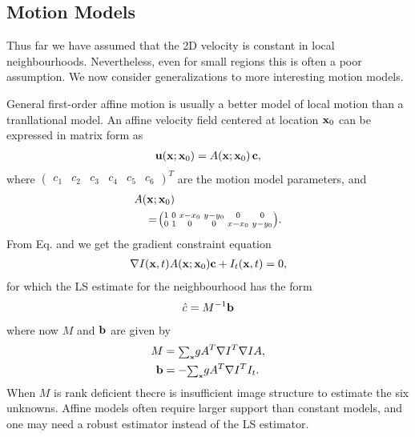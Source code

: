 \begin{compactdesc}
\section{Motion Models}
Thus far we have assumed that the 2D velocity is constant in local neighbourhoods. Nevertheless, even for small regions this is often a poor assumption. We now consider generalizations to more interesting motion models.
\item[\lp{Affine Model}]
	General first-order affine motion is usually a better model of local motion than a tranllational model. An affine velocity field centered at location $\bm{\mathrm{x}}_0$ can be expressed in matrix form as
	\begin{gather}
		\bm{\mathrm{u}}(\bm{\mathrm{x}};\bm{\mathrm{x}}_0)=A\!\left( \bm{\mathrm{x}};\bm{\mathrm{x}}_0 \right)\bm{\mathrm{c}},
		\label{eq:affinevelfield}
	\end{gather}
	where ${\!\left(\!\begin{smallmatrix}
		c_1&c_2&c_3&c_4&c_5&c_6
	\end{smallmatrix}\!\right)\!}^T$ are the motion model parameters, and
	\begin{align*}
		&A(\bm{\mathrm{x}};\bm{\mathrm{x}}_0)\\
		&\quad=
		\!\left(\!\begin{smallmatrix}
			1&0&x-x_0&y-y_0&0&0\\
			0&1&0&0&x-x_0&y-y_0
		\end{smallmatrix}\!\right)\!.
	\end{align*}
	From Eq. \label{eq:brightnessconst3} and \label{eq:affinevelfield} we get the gradient constraint equation
	\begin{gather*}
		\nabla I(\bm{\mathrm{x}},t)A(\bm{\mathrm{x}};\bm{\mathrm{x}}_0)\bm{\mathrm{c}}+I_t(\bm{\mathrm{x}},t)=0,
	\end{gather*}
	for which the LS estimate for the neighbourhood has the form
	\begin{gather}
		\hat{c}=M^{-1}\bm{\mathrm{b}}
		\label{eq:gradconstrlsest}
	\end{gather}
	where now $M$ and $\bm{\mathrm{b}}$ are given by 
	\begin{align*}
		M&={\scriptstyle\sum_{\bm{\mathrm{x}}}^{}}gA^{T}\nabla I^T \nabla IA,\\
		\bm{\mathrm{b}}&=-{\scriptstyle\sum_{\bm{\mathrm{x}}}^{}}g A^T\nabla I^T I_t.
	\end{align*}
	When $M$ is rank deficient thecre is insufficient image structure to estimate the six unknowns. Affine models often require larger support than constant models, and one may need a robust estimator instead of the LS estimator. 
	

\end{compactdesc}
